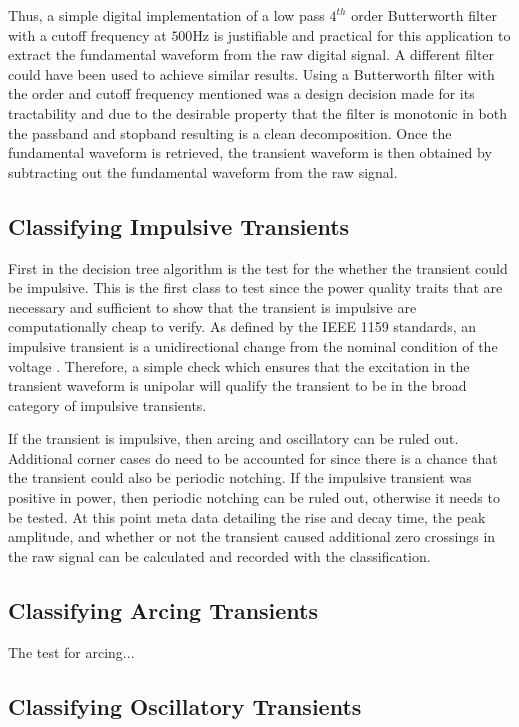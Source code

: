 \documentclass[10pt,conference,compsocconf]{IEEEtran}
\begin{document}
Thus, a simple digital implementation of a low pass $4^{th}$ order Butterworth filter with a cutoff frequency at $500$Hz is justifiable and practical for this application to extract the fundamental waveform from the raw digital signal. A different filter could have been used to achieve similar results. Using a Butterworth filter with the order and cutoff frequency mentioned was a design decision made for its tractability and due to the desirable property that the filter is monotonic in both the passband and stopband resulting is a clean decomposition. Once the fundamental waveform is retrieved, the transient waveform is then obtained by subtracting out the fundamental waveform from the raw signal.

\subsection{Classifying Impulsive Transients}

First in the decision tree algorithm is the test for the whether the transient could be impulsive. This is the first class to test since the power quality traits that are necessary and sufficient to show that the transient is impulsive are computationally cheap to verify. As defined by the IEEE 1159 standards, an impulsive transient is a unidirectional change from the nominal condition of the voltage \cite{IEEE:2018:1159D3}. Therefore, a simple check which ensures that the excitation in the transient waveform is unipolar will qualify the transient to be in the broad category of impulsive transients. 

If the transient is impulsive, then arcing and oscillatory can be ruled out. Additional corner cases do need to be accounted for since there is a chance that the transient could also be periodic notching. If the impulsive transient was positive in power, then periodic notching can be ruled out, otherwise it needs to be tested. At this point meta data detailing the rise and decay time, the peak amplitude, and whether or not the transient caused additional zero crossings in the raw signal can be calculated and recorded with the classification. 

\subsection{Classifying Arcing Transients}

The test for arcing... 

\subsection{Classifying Oscillatory Transients}
\end{document}
